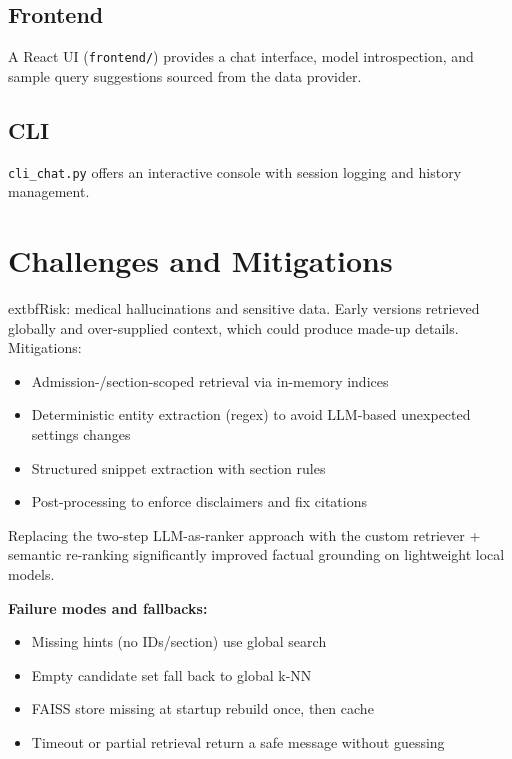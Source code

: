 \subsection{Frontend}
A React UI (\texttt{frontend/}) provides a chat interface, model introspection, and sample query suggestions sourced from the data provider.

\subsection{CLI}
\texttt{cli\_chat.py} offers an interactive console with session logging and history management.

\section{Challenges and Mitigations}
  	extbf{Risk: medical hallucinations and sensitive data.} Early versions retrieved globally and over-supplied context, which could produce made-up details. Mitigations:
\begin{itemize}
  \item Admission-/section-scoped retrieval via in-memory indices
  \item Deterministic entity extraction (regex) to avoid LLM-based unexpected settings changes
  \item Structured snippet extraction with section rules
  \item Post-processing to enforce disclaimers and fix citations
\end{itemize}

\noindent Replacing the two-step LLM-as-ranker approach with the custom retriever + semantic re-ranking significantly improved factual grounding on lightweight local models.

\noindent \textbf{Failure modes and fallbacks:}
\begin{itemize}
  \item Missing hints (no IDs/section) \textrightarrow{} use global search
  \item Empty candidate set \textrightarrow{} fall back to global k-NN
  \item FAISS store missing at startup \textrightarrow{} rebuild once, then cache
  \item Timeout or partial retrieval \textrightarrow{} return a safe message without guessing
\end{itemize}

